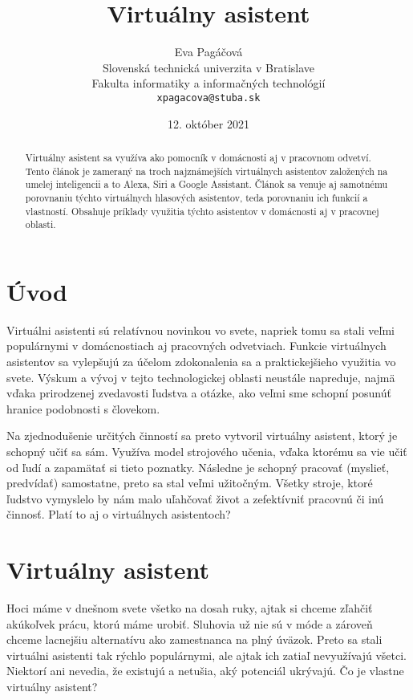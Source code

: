 \documentclass[10pt,twoside,slovak,coursepaper]{article}
\title{Virtuálny asistent}
\author{Eva Pagáčová\\[2pt]
	{\small Slovenská technická univerzita v Bratislave}\\
	{\small Fakulta informatiky a informačných technológií}\\
	{\small \texttt{xpagacova@stuba.sk}}
	}
\date{\small 12. október 2021}
\begin{document}
\maketitle

\begin{abstract}
Virtuálny asistent sa využíva ako pomocník v domácnosti aj v pracovnom odvetví. Tento článok je zameraný na troch najznámejších virtuálnych asistentov založených na umelej inteligencii a to Alexa, Siri a Google Assistant. Článok sa venuje aj samotnému porovnaniu týchto virtuálnych hlasových asistentov, teda porovnaniu ich funkcií a vlastností. Obsahuje príklady využitia týchto asistentov v domácnosti aj v pracovnej oblasti.
\end{abstract}

\section{Úvod}

Virtuálni asistenti sú relatívnou novinkou vo svete, napriek tomu sa stali veľmi populárnymi v domácnostiach aj pracovných odvetviach. Funkcie virtuálnych asistentov sa vylepšujú za účelom zdokonalenia sa a praktickejšieho využitia vo svete. Výskum a vývoj v tejto technologickej oblasti neustále napreduje, najmä vďaka prirodzenej zvedavosti ľudstva a otázke, ako veľmi sme schopní posunúť hranice podobnosti s človekom. 

Na zjednodušenie určitých činností sa preto vytvoril virtuálny asistent, ktorý je schopný učiť sa sám. Využíva model strojového učenia, vďaka ktorému sa vie učiť od ľudí a zapamätať si tieto poznatky. Následne je schopný pracovať (myslieť, predvídať) samostatne, preto sa stal veľmi užitočným. Všetky stroje, ktoré ľudstvo vymyslelo by nám malo uľahčovať život a zefektívniť pracovnú či inú činnosť. Platí to aj o virtuálnych asistentoch?

\section{Virtuálny asistent}

Hoci máme v dnešnom svete všetko na dosah ruky, ajtak si chceme zľahčiť akúkoľvek prácu, ktorú máme urobiť. Sluhovia už nie sú v móde a zároveň chceme lacnejšiu alternatívu ako zamestnanca na plný úväzok. Preto sa stali virtuálni asistenti tak rýchlo populárnymi, ale ajtak ich zatiaľ nevyužívajú všetci. Niektorí ani nevedia, že existujú a netušia, aký potenciál ukrývajú. Čo je vlastne virtuálny asistent?
\end{document}

